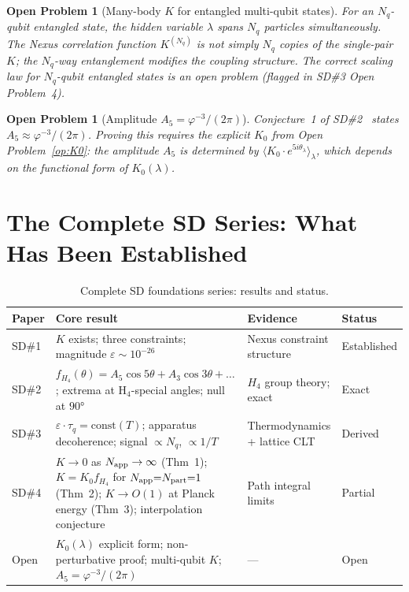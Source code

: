 \documentclass[11pt,letterpaper]{article}
\newtheorem{openprob}[theorem]{Open Problem}
\newcommand{\phig}{\varphi}
\newcommand{\eps}{\varepsilon}
\newcommand{\Napp}{N_{\rm app}}
\newcommand{\Npart}{N_{\rm part}}
\begin{document}
\begin{openprob}[Many-body $K$ for entangled multi-qubit states]
\label{op:multiqubit}
For an $N_q$-qubit entangled state, the hidden variable $\lambda$
spans $N_q$ particles simultaneously.  The Nexus correlation
function $K^{(N_q)}$ is not simply $N_q$ copies of the single-pair
$K$; the $N_q$-way entanglement modifies the coupling structure.
The correct scaling law for $N_q$-qubit entangled states is an
open problem (flagged in SD\#3 Open Problem~4).
\end{openprob}

\begin{openprob}[Amplitude $A_5 = \phig^{-3}/(2\pi)$]
\label{op:A5}
Conjecture~1 of SD\#2~\citep{cpp_sd2} states $A_5 \approx
\phig^{-3}/(2\pi)$.  Proving this requires the explicit $K_0$
from Open Problem~\ref{op:K0}: the amplitude $A_5$ is determined
by $\langle K_0 \cdot e^{5i\theta_\lambda}\rangle_\lambda$, which
depends on the functional form of $K_0(\lambda)$.
\end{openprob}

\section{The Complete SD Series: What Has Been Established}

\begin{table}[H]
\centering
\caption{Complete SD foundations series: results and status.}
\label{tab:series_status}
\begin{tabular}{@{}p{1cm}p{4.5cm}p{4.5cm}p{2.5cm}@{}}
\toprule
Paper & Core result & Evidence & Status \\
\midrule
SD\#1 & $K$ exists; three constraints; magnitude $\eps \sim 10^{-26}$ &
  Nexus constraint structure & Established \\[4pt]
SD\#2 & $f_{H_4}(\theta) = A_5\cos5\theta + A_3\cos3\theta + \ldots$;
  extrema at H$_4$-special angles; null at $90°$ &
  $H_4$ group theory; exact & Exact \\[4pt]
SD\#3 & $\eps\cdot\tau_q = \text{const}(T)$; apparatus decoherence;
  signal $\propto N_q$, $\propto 1/T$ &
  Thermodynamics + lattice CLT & Derived \\[4pt]
SD\#4 & $K\to0$ as $\Napp\to\infty$ (Thm~1); $K = K_0 f_{H_4}$ for
  $\Napp{=}\Npart{=}1$ (Thm~2); $K\to O(1)$ at Planck energy (Thm~3);
  interpolation conjecture & Path integral limits & Partial \\[4pt]
\midrule
Open & $K_0(\lambda)$ explicit form; non-perturbative proof;
  multi-qubit $K$; $A_5 = \phig^{-3}/(2\pi)$ & --- & Open \\
\bottomrule
\end{tabular}
\end{table}
\end{document}
